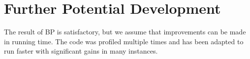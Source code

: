 \documentclass[a4paper,10pt,notitlepage,fullpage]{paper}
\theoremstyle{plain}
\theoremstyle{definition}
\begin{document}


\section{Further Potential Development}
The result of BP is satisfactory, but we assume that improvements can be made in running time.
The code was profiled multiple times and has been adapted to run faster with significant gains in many instances.

\end{document}
